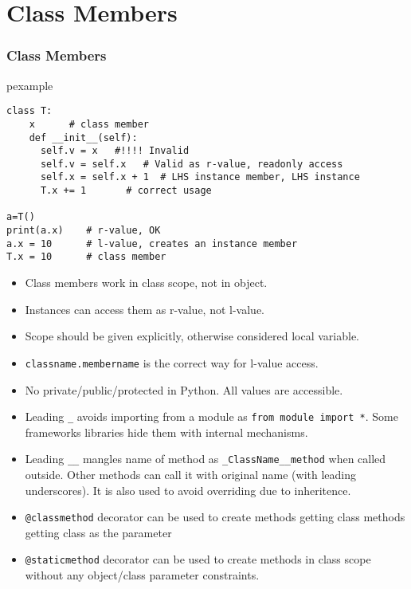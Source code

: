 \documentclass[trans,compress,xcolor=table]{beamer}
\begin{document}
\section{Class Members}
\begin{frame}[fragile]
\frametitle{Class Members}
\begin{beamercolorbox}{pexample}
\begin{lstlisting}
class T:
    x      # class member
    def __init__(self):
      self.v = x   #!!!! Invalid
      self.v = self.x   # Valid as r-value, readonly access
      self.x = self.x + 1  # LHS instance member, LHS instance
      T.x += 1       # correct usage

a=T()
print(a.x)    # r-value, OK
a.x = 10      # l-value, creates an instance member
T.x = 10      # class member
\end{lstlisting}
\end{beamercolorbox}
\begin{itemize}
\item Class members work in class scope, not in object.
\item Instances can access them as r-value, not l-value.
\item Scope should be given explicitly, otherwise considered local variable.
\item \lstinline!classname.membername! is the correct way for l-value access.
\end{itemize}
\end{frame}
\begin{frame}[fragile]
\begin{itemize}
\item No private/public/protected in Python. All values are accessible.
\item Leading \lstinline!_! avoids importing from a module as \lstinline!from module import *!. Some frameworks libraries hide them with internal mechanisms.
\item Leading \lstinline!__! mangles name of method  as \lstinline!_ClassName__method! 
	when called outside. Other methods can call it with original name (with leading underscores). It is also used to avoid overriding due to inheritence.
\item \lstinline!@classmethod! decorator can be used to create methods getting class methods getting class as the parameter
\item \lstinline!@staticmethod! decorator can be used to create methods in class scope without any object/class parameter constraints.
\end{itemize}
\end{frame}
\end{document}
